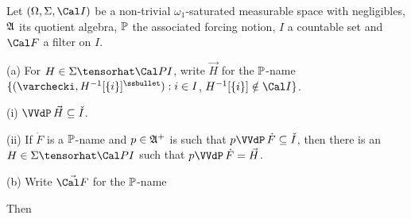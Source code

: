  Let $(\Omega,\Sigma,\Cal I)$ be a non-trivial
$\omega_1$-saturated
measurable space with negligibles, $\frak A$ its quotient algebra,
$\Bbb P$ the associated forcing notion,
$I$ a countable set and $\Cal F$ a filter on $I$.

(a) For $H\in\Sigma\tensorhat\Cal PI$,
write $\vec H$ for the $\Bbb P$-name
$\{(\varchecki,H^{-1}[\{i\}]^{\ssbullet}):
i\in I$, $H^{-1}[\{i\}]\notin\Cal I\}$.

\quad(i) $\VVdP\,\vec H\subseteq\check{I}$.

\quad(ii) If $\dot F$ is a $\Bbb P$-name and $p\in\frak A^+$ is such that
$p\VVdP\,\dot F\subseteq\check{I}$, then there is an
$H\in\Sigma\tensorhat\Cal P I$ such that
$p\VVdP\,\dot F=\vec H$.

(b) Write $\vec{\Cal F}$ for the $\Bbb P$-name


\noindent Then


